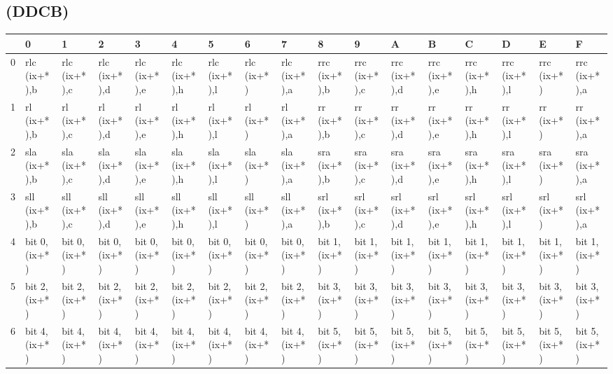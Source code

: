 \subsection{ (DDCB)}
\label{OPCDDCB}
\begin{ttfamily}
\begin{tiny}
\begin{tabularx}{1\textwidth}{l|X|X|X|X|X|X|X|X|X|X|X|X|X|X|X|X}

& 0 & 1 & 2 & 3 & 4 & 5 & 6 & 7 & 8 & 9 & A & B & C & D & E & F \\ \hline
0 & rlc (ix+*),b & rlc (ix+*),c & rlc (ix+*),d & rlc (ix+*),e & rlc (ix+*),h & rlc (ix+*),l & rlc (ix+*) & rlc (ix+*),a & rrc (ix+*),b &  rrc (ix+*),c & rrc (ix+*),d & rrc (ix+*),e & rrc (ix+*),h & rrc (ix+*),l & rrc (ix+*) & rrc (ix+*),a \\ \hline
1 & rl (ix+*),b & rl (ix+*),c & rl (ix+*),d & rl (ix+*),e & rl (ix+*),h & rl (ix+*),l & rl (ix+*) & rl (ix+*),a & rr (ix+*),b & rr (ix+*),c & rr (ix+*),d & rr (ix+*),e & rr (ix+*),h & rr (ix+*),l & rr (ix+*) & rr (ix+*),a \\ \hline
2 & sla (ix+*),b & sla (ix+*),c & sla (ix+*),d & sla (ix+*),e & sla (ix+*),h & sla (ix+*),l & sla (ix+*) & sla (ix+*),a & sra (ix+*),b & sra (ix+*),c & sra (ix+*),d & sra (ix+*),e & sra (ix+*),h & sra (ix+*),l & sra (ix+*) & sra (ix+*),a \\ \hline
3 & sll (ix+*),b & sll (ix+*),c & sll (ix+*),d & sll (ix+*),e & sll (ix+*),h & sll (ix+*),l & sll (ix+*) & sll (ix+*),a & srl (ix+*),b & srl (ix+*),c & srl (ix+*),d & srl (ix+*),e & srl (ix+*),h & srl (ix+*),l & srl (ix+*) & srl (ix+*),a \\ \hline
4 & bit 0, (ix+*) & bit 0, (ix+*) & bit 0, (ix+*) & bit 0, (ix+*) & bit 0, (ix+*) & bit 0, (ix+*) & bit 0, (ix+*) & bit 0, (ix+*) & bit 1, (ix+*) & bit 1, (ix+*) & bit 1, (ix+*) & bit 1, (ix+*) & bit 1, (ix+*) & bit 1, (ix+*) & bit 1, (ix+*) & bit 1, (ix+*) \\ \hline
5 & bit 2, (ix+*) & bit 2, (ix+*) & bit 2, (ix+*) & bit 2, (ix+*) & bit 2, (ix+*) & bit 2, (ix+*) & bit 2, (ix+*) & bit 2, (ix+*) & bit 3, (ix+*) & bit 3, (ix+*) & bit 3, (ix+*) & bit 3, (ix+*) & bit 3, (ix+*) & bit 3, (ix+*) & bit 3, (ix+*) & bit 3, (ix+*) \\ \hline
6 & bit 4, (ix+*) & bit 4, (ix+*) & bit 4, (ix+*) & bit 4, (ix+*) & bit 4, (ix+*) & bit 4, (ix+*) & bit 4, (ix+*) & bit 4, (ix+*) & bit 5, (ix+*) & bit 5, (ix+*) & bit 5, (ix+*) & bit 5, (ix+*) & bit 5, (ix+*) & bit 5, (ix+*) & bit 5, (ix+*) & bit 5, (ix+*) \\ \hline

\end{tabularx}
\end{tiny}
\end{ttfamily}
